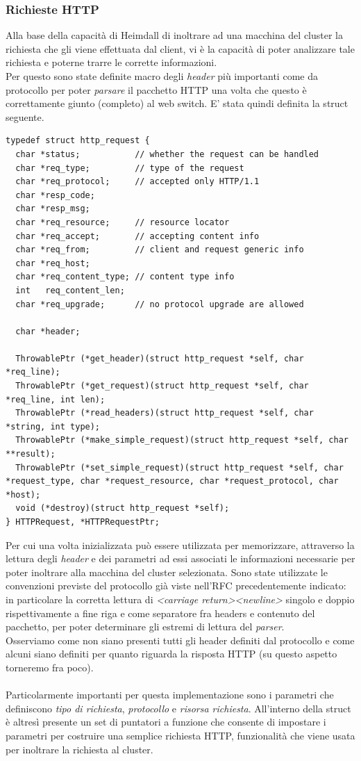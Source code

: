 \documentclass[italian]{tktltiki2}
\begin{document}
\subsubsection*{Richieste HTTP}
Alla base della capacità di Heimdall di inoltrare ad una macchina del cluster la richiesta che gli viene effettuata dal client, vi è la capacità di poter analizzare tale richiesta e poterne trarre le corrette informazioni. \\
Per questo sono state definite macro degli \emph{header} più importanti come da protocollo\cite{http_1.1} per poter \emph{parsare} il pacchetto HTTP una volta che questo è correttamente giunto (completo) al web switch. E' stata quindi definita la struct seguente.
\begin{lstlisting}
typedef struct http_request {
  char *status;           // whether the request can be handled
  char *req_type;         // type of the request
  char *req_protocol;     // accepted only HTTP/1.1
  char *resp_code;
  char *resp_msg;
  char *req_resource;     // resource locator
  char *req_accept;       // accepting content info
  char *req_from;         // client and request generic info
  char *req_host;
  char *req_content_type; // content type info
  int   req_content_len;
  char *req_upgrade;      // no protocol upgrade are allowed

  char *header;                                

  ThrowablePtr (*get_header)(struct http_request *self, char *req_line);
  ThrowablePtr (*get_request)(struct http_request *self, char *req_line, int len);
  ThrowablePtr (*read_headers)(struct http_request *self, char *string, int type);
  ThrowablePtr (*make_simple_request)(struct http_request *self, char **result);
  ThrowablePtr (*set_simple_request)(struct http_request *self, char *request_type, char *request_resource, char *request_protocol, char *host);
  void (*destroy)(struct http_request *self);
} HTTPRequest, *HTTPRequestPtr;

\end{lstlisting}
Per cui una volta inizializzata può essere utilizzata per memorizzare, attraverso la lettura degli \emph{header} e dei parametri ad essi associati le informazioni necessarie per poter inoltrare alla macchina del cluster selezionata. Sono state utilizzate le convenzioni previste del protocollo già viste nell'RFC precedentemente indicato: in particolare la corretta lettura di \emph{<carriage return><newline>} singolo e doppio rispettivamente a fine riga e come separatore fra headers e contenuto del pacchetto, per poter determinare gli estremi di lettura del \emph{parser}.
\\ 
Osserviamo come non siano presenti tutti gli header definiti dal protocollo e come alcuni siano definiti per quanto riguarda la risposta HTTP (su questo aspetto torneremo fra poco). 
\\
\\
Particolarmente importanti per questa implementazione sono i parametri che definiscono \emph{tipo di richiesta}, \emph{protocollo} e \emph{risorsa richiesta}. All'interno della struct è altresì presente un set di puntatori a funzione che consente di impostare i parametri per costruire una semplice richiesta HTTP, funzionalità che viene usata per inoltrare la richiesta al cluster.
\end{document}
